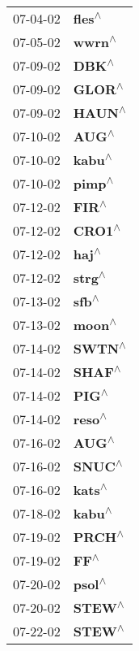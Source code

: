 \begin{supertabular}{p{0.08\textwidth}p{0.2\textwidth}}
 07-04-02 &    \textbf{fles\textsuperscript{$\wedge$}} \\
 07-05-02 &    \textbf{wwrn\textsuperscript{$\wedge$}} \\
 07-09-02 &     \textbf{DBK\textsuperscript{$\wedge$}} \\
 07-09-02 &    \textbf{GLOR\textsuperscript{$\wedge$}} \\
 07-09-02 &    \textbf{HAUN\textsuperscript{$\wedge$}} \\
 07-10-02 &     \textbf{AUG\textsuperscript{$\wedge$}} \\
 07-10-02 &    \textbf{kabu\textsuperscript{$\wedge$}} \\
 07-10-02 &    \textbf{pimp\textsuperscript{$\wedge$}} \\
 07-12-02 &     \textbf{FIR\textsuperscript{$\wedge$}} \\
 07-12-02 &    \textbf{CRO1\textsuperscript{$\wedge$}} \\
 07-12-02 &     \textbf{haj\textsuperscript{$\wedge$}} \\
 07-12-02 &    \textbf{strg\textsuperscript{$\wedge$}} \\
 07-13-02 &     \textbf{sfb\textsuperscript{$\wedge$}} \\
 07-13-02 &    \textbf{moon\textsuperscript{$\wedge$}} \\
 07-14-02 &    \textbf{SWTN\textsuperscript{$\wedge$}} \\
 07-14-02 &    \textbf{SHAF\textsuperscript{$\wedge$}} \\
 07-14-02 &     \textbf{PIG\textsuperscript{$\wedge$}} \\
 07-14-02 &    \textbf{reso\textsuperscript{$\wedge$}} \\
 07-16-02 &     \textbf{AUG\textsuperscript{$\wedge$}} \\
 07-16-02 &    \textbf{SNUC\textsuperscript{$\wedge$}} \\
 07-16-02 &    \textbf{kats\textsuperscript{$\wedge$}} \\
 07-18-02 &    \textbf{kabu\textsuperscript{$\wedge$}} \\
 07-19-02 &    \textbf{PRCH\textsuperscript{$\wedge$}} \\
 07-19-02 &      \textbf{FF\textsuperscript{$\wedge$}} \\
 07-20-02 &    \textbf{psol\textsuperscript{$\wedge$}} \\
 07-20-02 &    \textbf{STEW\textsuperscript{$\wedge$}} \\
 07-22-02 &    \textbf{STEW\textsuperscript{$\wedge$}} \\

\end{supertabular}
